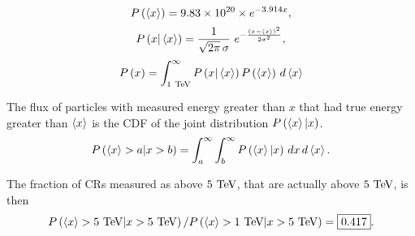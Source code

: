 \begin{equation}
  P\left(\left<x\right>\right) = \num{9.83e20}\times e^{-3.914 x},
\end{equation}
\begin{equation}
  P\left(x|\left<x\right>\right) = \frac{1}{\sqrt{2\pi}\,\sigma}\ e^{-\frac{(x-\left<x\right>)^2}{2\sigma^2}},
\end{equation}
\begin{equation}
  P\left(x\right) = \int_{1~\text{TeV}}^\infty P\left(x|\left<x\right>\right) P\left(\left<x\right>\right)\, d\left<x\right>
\end{equation}

The flux of particles with measured energy greater than $x$ that had true energy greater than $\left<x\right>$ is the CDF of the joint distribution $P\left(\left<x\right>|x\right)$.
\begin{equation}
  P\left(\left<x\right>>a|x>b\right) = \int_a^\infty \int_b^\infty P\left(\left<x\right>|x\right)\, dx\, d\left<x\right>.
\end{equation}

The fraction of CRs measured as above $5~\text{TeV}$, that are actually above $5~\text{TeV}$, is then
\begin{equation}
  P\left(\left<x\right>>5~\text{TeV}|x>5~\text{TeV}\right) / P\left(\left<x\right>>1~\text{TeV}|x>5~\text{TeV}\right) = \boxed{ 0.417 }.
\end{equation}

